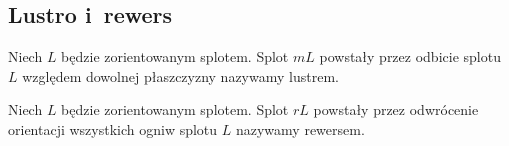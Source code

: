 \subsection{Lustro i~rewers} %
\begin{definition}[lustro]
%
%
    Niech $L$ będzie zorientowanym splotem.
    Splot $mL$ powstały przez odbicie splotu $L$ względem dowolnej płaszczyzny nazywamy lustrem.
\end{definition}

\begin{definition}[rewers]
%
%
    Niech $L$ będzie zorientowanym splotem.
    Splot $rL$ powstały przez odwrócenie orientacji wszystkich ogniw splotu $L$ nazywamy rewersem.
\end{definition}

